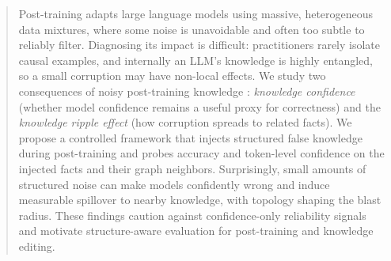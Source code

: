 \begin{abstract}

Post-training adapts large language models using massive, heterogeneous data mixtures, where some noise is unavoidable and often too subtle to reliably filter.  Diagnosing its impact is difficult: practitioners rarely isolate causal examples,  and internally an LLM’s knowledge is highly entangled, so a small corruption may have non-local effects. We study two consequences of noisy post-training knowledge : \emph{knowledge confidence} (whether model confidence remains a useful proxy for correctness) and the \emph{knowledge ripple effect} (how corruption spreads to related facts). We propose a controlled framework that injects structured false knowledge during post-training and probes accuracy and token-level confidence on the injected facts and their graph neighbors.  Surprisingly, small amounts of structured noise  can make models confidently wrong and induce measurable spillover to nearby knowledge, with topology shaping the blast radius. These findings caution against confidence-only reliability signals and motivate structure-aware evaluation for post-training and knowledge editing.
\end{abstract}